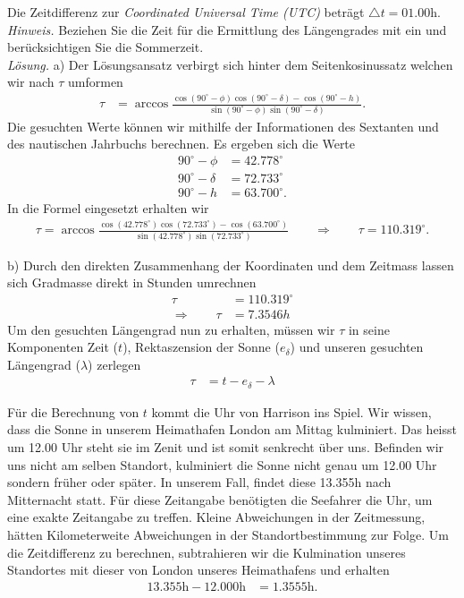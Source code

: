 \begin{refsection}
Die Zeitdifferenz zur \textit{Coordinated Universal Time (UTC)} beträgt $\triangle{t}=01.00$h. \\

\textit{Hinweis.} Beziehen Sie die Zeit für die Ermittlung des Längengrades mit ein und berücksichtigen Sie die Sommerzeit. \\

\textit{Lösung.} \quad a) Der Lösungsansatz verbirgt sich hinter dem Seitenkosinussatz welchen wir nach $\tau$ umformen
\begin{align*}
\tau &= \arccos 
\frac{ \cos(90^{\circ} - \phi) \cos(90^{\circ} - \delta) - \cos(90^{\circ} - h)} {\sin(90^{\circ} - \phi)\sin(90^{\circ} - \delta)}.
\end{align*}
Die gesuchten Werte können wir mithilfe der Informationen des Sextanten und des nautischen Jahrbuchs berechnen. Es ergeben sich die Werte
\begin{align*}
90^{\circ} - \phi &= 42.778^{\circ}
\\
90^{\circ} - \delta &= 72.733^{\circ}
\\
90^{\circ} - h &= 63.700^{\circ}.
\end{align*}
In die Formel eingesetzt erhalten wir
\begin{align*}
\tau = \arccos 
\frac{ \cos(42.778^{\circ}) \cos(72.733^{\circ}) - \cos(63.700^{\circ})} {\sin(42.778^{\circ})\sin(72.733^{\circ})}
\qquad \Rightarrow \qquad
\tau = 110.319^{\circ}.
\end{align*}

b) \quad  Durch den direkten Zusammenhang der Koordinaten und dem Zeitmass lassen sich Gradmasse direkt in Stunden umrechnen
\begin{align*}
\tau &= 110.319^{\circ} \\
\Rightarrow \quad \quad
\tau &= 7.3546h
\end{align*}
Um den gesuchten Längengrad nun zu erhalten, müssen wir $\tau$ in seine Komponenten Zeit ($t$), Rektaszension der Sonne ($e_\delta$) und unseren gesuchten Längengrad ($\lambda$) zerlegen
\begin{align*}
\tau &= t - e_\delta - \lambda 
\end{align*}


Für die Berechnung von $t$ kommt die Uhr von Harrison ins Spiel. Wir wissen, dass die Sonne in unserem Heimathafen London am Mittag kulminiert. Das heisst um 12.00 Uhr steht sie im Zenit und ist somit senkrecht über uns. 
Befinden wir uns nicht am selben Standort, kulminiert die Sonne nicht genau um 12.00 Uhr sondern früher oder später.
In unserem Fall, findet diese 13.355h nach Mitternacht statt. Für diese Zeitangabe benötigten die Seefahrer die Uhr, um eine exakte Zeitangabe zu treffen. Kleine Abweichungen in der Zeitmessung, hätten Kilometerweite Abweichungen in der Standortbestimmung zur Folge.
Um die Zeitdifferenz zu berechnen, subtrahieren wir die Kulmination unseres Standortes mit dieser von London unseres Heimathafens und erhalten
\begin{align*}
13.355 \text{h} - 12.000 \text{h} &= 1.3555 \text{h}.
\end{align*}


\end{refsection}
